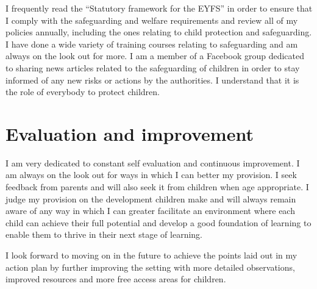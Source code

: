 \documentclass[10pt,a4paper]{report}
\begin{document}
I frequently read the “Statutory framework for the EYFS” in order to ensure that I comply with the safeguarding and welfare requirements and review all of my policies annually, including the ones relating to child protection and safeguarding. I have done a wide variety of training courses relating to safeguarding and am always on the look out for more. I am a member of a Facebook group dedicated to sharing news articles related to the safeguarding of children in order to stay informed of any new risks or actions by the authorities. I understand that it is the role of everybody to protect children.

\section{Evaluation and improvement}

I am very dedicated to constant self evaluation and continuous improvement. I am always on the look out for ways in which I can better my provision. I seek feedback from parents and will also seek it from children when age appropriate. I judge my provision on the development children make and will always remain aware of any way in which I can greater facilitate an environment where each child can achieve their full potential and develop a good foundation of learning to enable them to thrive in their next stage of learning. 

I look forward to moving on in the future to achieve the points laid out in my action plan by further improving the setting with more detailed observations, improved resources and more free access areas for children.
\end{document}
